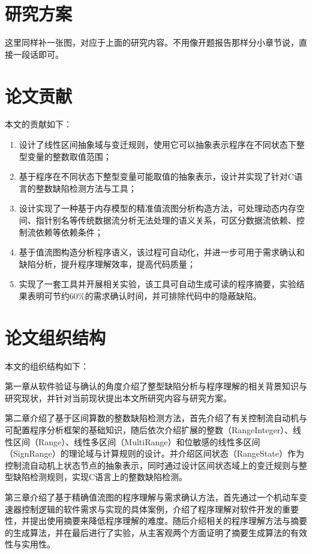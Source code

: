  \section{研究方案}
 
 这里同样补一张图，对应于上面的研究内容。不用像开题报告那样分小章节说，直接一段话即可。
 
 \section{论文贡献}
 
 本文的贡献如下：
 \begin{enumerate}
 	\item 设计了线性区间抽象域与变迁规则，使用它可以抽象表示程序在不同状态下整型变量的整数取值范围；
 	
 	\item 基于程序在不同状态下整型变量可能取值的抽象表示，设计并实现了针对C语言的整数缺陷检测方法与工具；
 	
	\item 设计实现了一种基于内存模型的精准值流图分析构造方法，可处理动态内存空间、指针别名等传统数据流分析无法处理的语义关系，可区分数据流依赖、控制流依赖等依赖条件；
	
	\item 基于值流图构造分析程序语义，该过程可自动化，并进一步可用于需求确认和缺陷分析，提升程序理解效率，提高代码质量；
	
	\item 实现了一套工具并开展相关实验，该工具可自动生成可读的程序摘要，实验结果表明可节约60\%的需求确认时间，并可排除代码中的隐蔽缺陷。
 \end{enumerate}
 
 \section{论文组织结构}
 
 本文的组织结构如下：
 
 第一章从软件验证与确认的角度介绍了整型缺陷分析与程序理解的相关背景知识与研究现状，并针对当前现状提出本文所研究内容与研究方案。
 
 第二章介绍了基于区间算数的整数缺陷检测方法，首先介绍了有关控制流自动机与可配置程序分析框架的基础知识，随后依次介绍扩展的整数（RangeInteger）、线性区间（Range）、线性多区间（MultiRange）和位敏感的线性多区间（SignRange）的理论域与计算规则的设计。并介绍区间状态（RangeState）作为控制流自动机上状态节点的抽象表示，同时通过设计区间状态域上的变迁规则与整型缺陷检测规则，实现C语言上的整数缺陷检测。
 
 第三章介绍了基于精确值流图的程序理解与需求确认方法，首先通过一个机动车变速器控制逻辑的软件需求与实现的具体案例，介绍了程序理解对软件开发的重要性，并提出使用摘要来降低程序理解的难度。随后介绍相关的程序理解方法与摘要的生成算法，并在最后进行了实验，从主客观两个方面证明了摘要生成算法的有效性与实用性。
 
 
 
 
 
 
 
 
 
 
 
 
 
 
 
 
 
 
 
 
 
 
 
 
 
 
 
 
 
 
 
 
 